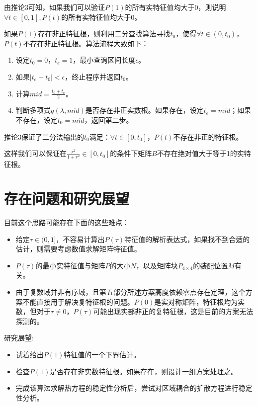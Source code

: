 \documentclass[UTF8]{ctexart}
\theoremstyle{plain}
\theoremstyle{definition}
\theoremstyle{remark}
\begin{document}
由推论3可知，如果我们可以验证$P(1)$的所有实特征值均大于0，则说明$\forall t\in[0,1],P(t)$的所有实特征值均大于0。

如果$P(1)$存在非正特征根，则利用二分查找算法寻找$t_{0}$，使得$\forall t\in(0,t_{0})$，$P(t)$不存在非正特征根。算法流程大致如下：

\begin{enumerate}
    \item 设定$t_{0}=0$，$t_{e}=1$，最小查询区间长度$\epsilon$。
    \item 如果$|t_{e}-t_{0}|<\epsilon$，终止程序并返回$t_{0}$。
    \item 计算$mid=\frac{t_{0}+t_{e}}{2}$。
    \item 判断多项式$g(\lambda,mid)$是否存在非正实数根。如果存在，设定$t_{e}=mid$；如果不存在，设定$t_{0}=mid$，返回第二步。
\end{enumerate}

推论3保证了二分法输出的$t_{0}$满足：$\forall t\in[0,t_{0}]$，$P(t)$不存在非正的特征根。

这样我们可以保证在$\frac{r^2}{1+r^2}\in[0,t_{0}]$的条件下矩阵$B$不存在绝对值大于等于1的实特征根。

\section{存在问题和研究展望}

目前这个思路可能存在下面的这些难点：
\begin{itemize}
    \item 给定$\tau\in(0,1]$，不容易计算出$P(\tau)$特征值的解析表达式，如果找不到合适的估计，则需要考虑数值求解矩阵特征值。
    \item $P(\tau)$的最小实特征值与矩阵$P$的大小$N$，以及矩阵块$P_{4\times 4}$的装配位置$M$有关。
    \item 由于复数域并非有序域，且第五部分所述方案高度依赖零点存在定理，这个方案不能直接用于解决复特征根的问题。$P(0)$是实对称矩阵，特征根均为实数，但对于$\tau\neq 0$，$P(\tau)$可能出现实部非正的复特征根，这是目前的方案无法探测的。
\end{itemize}

研究展望:
\begin{itemize}
    \item 试着给出$P(1)$特征值的一个下界估计。
    \item 检查$P(1)$是否存在非实数特征根。如果存在，则设计一组方案处理之。
    \item 完成该算法求解热方程的稳定性分析后，尝试对区域耦合的扩散方程进行稳定性分析。
\end{itemize}
\end{document}
